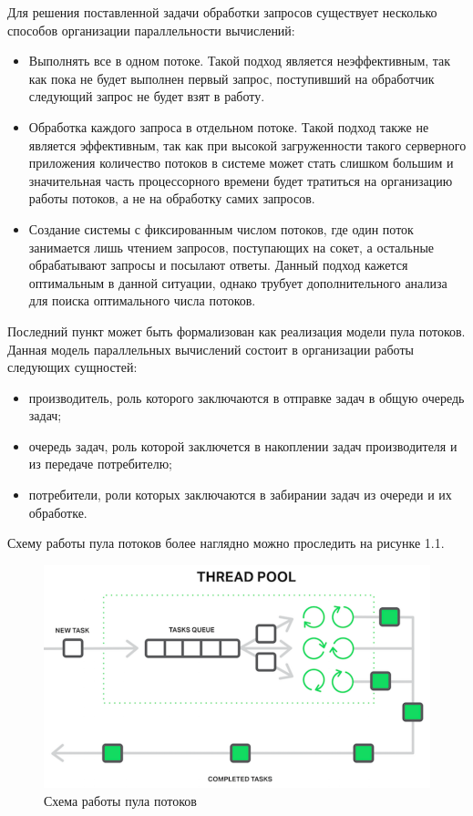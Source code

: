 Для решения поставленной задачи обработки запросов существует несколько способов организации параллельности вычислений:

\begin{itemize}
	\item Выполнять все в одном потоке. Такой подход является неэффективным, так как пока не будет выполнен первый запрос, поступивший на обработчик следующий запрос не будет взят в работу. 
	\item Обработка каждого запроса в отдельном потоке. Такой подход также не является эффективным, так как при высокой загруженности такого серверного приложения количество потоков в системе может стать слишком большим и значительная часть процессорного времени будет тратиться на организацию работы потоков, а не на обработку самих запросов.
	\item Создание системы с фиксированным числом потоков, где один поток занимается лишь чтением запросов, поступающих на сокет, а остальные обрабатывают запросы и посылают ответы. Данный подход кажется оптимальным в данной ситуации, однако трубует дополнительного анализа для поиска оптимального числа потоков.
\end{itemize}


Последний пункт может быть формализован как реализация модели пула потоков. Данная модель параллельных вычислений состоит в организации работы следующих сущностей:
\begin{itemize}
	\item производитель, роль которого заключаются в отправке задач в общую очередь задач;
	\item очередь задач, роль которой заключется в накоплении задач производителя и из передаче потребителю;
	\item потребители, роли которых заключаются в забирании задач из очереди и их обработке.
\end{itemize}

Схему работы пула потоков более наглядно можно проследить на рисунке 1.1.


\begin{figure}[ht!]
	\centering
	\includegraphics[width=0.9\linewidth]{img/thread_pool.png}
	\caption{Схема работы пула потоков}
	\label{fig:tp}
\end{figure}

